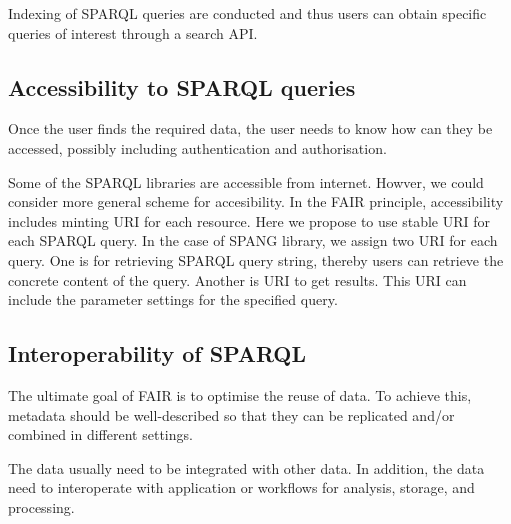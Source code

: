 \documentclass[runningheads]{llncs}
\begin{document}
Indexing of SPARQL queries are conducted and thus users can obtain specific queries of interest through a search API.

\subsection{Accessibility to SPARQL queries}
Once the user finds the required data, the user needs to know how can they be accessed, possibly including authentication and authorisation.

Some of the SPARQL libraries are accessible from internet. Howver, we could consider more general scheme for accesibility. In the FAIR principle, accessibility includes minting URI for each resource. Here we propose to use stable URI for each SPARQL query.
In the case of SPANG library, we assign two URI for each query. One is for retrieving SPARQL query string, thereby users can retrieve the concrete content of the query. Another is URI to get results. This URI can include the parameter settings for the specified query.

\subsection{Interoperability of SPARQL}
The ultimate goal of FAIR is to optimise the reuse of data. To achieve this, metadata should be well-described so that they can be replicated and/or combined in different settings.

The data usually need to be integrated with other data. In addition, the data need to interoperate with application or workflows for analysis, storage, and processing.
\end{document}
